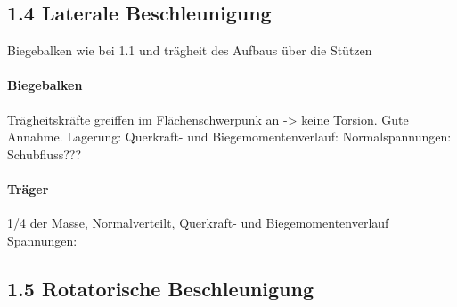 \subsection{1.4 Laterale Beschleunigung}
Biegebalken wie bei 1.1 und trägheit des Aufbaus über die Stützen
\paragraph{Biegebalken}
Trägheitskräfte greiffen im Flächenschwerpunk an -> keine Torsion. Gute Annahme.
Lagerung:
Querkraft- und Biegemomentenverlauf:
Normalspannungen:
Schubfluss???

\paragraph{Träger}
1/4 der Masse, Normalverteilt, Querkraft- und Biegemomentenverlauf
Spannungen:

\subsection{1.5 Rotatorische Beschleunigung}












